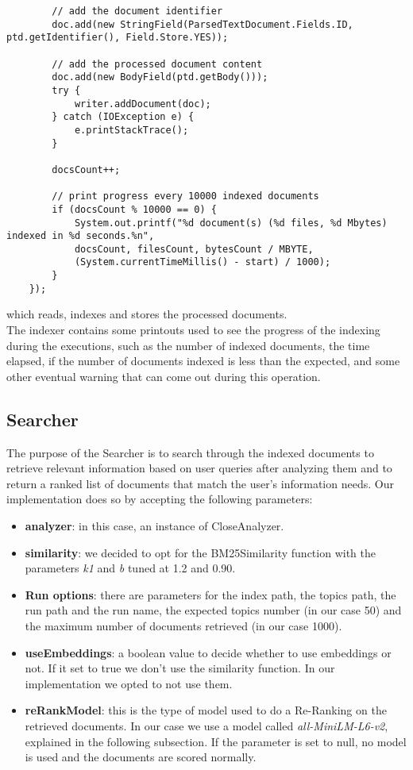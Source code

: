 \begin{itemize}
\begin{lstlisting}
        // add the document identifier
        doc.add(new StringField(ParsedTextDocument.Fields.ID, ptd.getIdentifier(), Field.Store.YES));

        // add the processed document content
        doc.add(new BodyField(ptd.getBody()));
        try {
            writer.addDocument(doc);
        } catch (IOException e) {
            e.printStackTrace();
        }

        docsCount++;

        // print progress every 10000 indexed documents
        if (docsCount % 10000 == 0) {
            System.out.printf("%d document(s) (%d files, %d Mbytes) indexed in %d seconds.%n",
            docsCount, filesCount, bytesCount / MBYTE,
            (System.currentTimeMillis() - start) / 1000);
        }
    });
\end{lstlisting}
which reads, indexes and stores the processed documents. \\
The indexer contains some printouts used to see the progress of the indexing during the executions, such as the number of indexed documents, the time elapsed, if the number of documents indexed is less than the expected, and some other eventual warning that can come out during this operation.

\subsection{Searcher}
The purpose of the Searcher is to search through the indexed documents to retrieve relevant information based on user queries after analyzing them and to
return a ranked list of documents that match the user’s information needs.
\newline
Our implementation does so by accepting the following parameters:
\begin{itemize}
  \item \textbf{analyzer}: in this case, an instance of CloseAnalyzer.
  \item \textbf{similarity}: we decided to opt for the BM25Similarity function with the parameters \textit{k1} and \textit{b} tuned at 1.2 and 0.90.
  \item \textbf{Run options}: there are parameters for the index path, the topics path, the run path and the run name, the expected topics number (in our case 50) and the maximum number of documents retrieved (in our case 1000).
  \item \textbf{useEmbeddings}: a boolean value to decide whether to use embeddings or not. If it set to true we don't use the similarity function. In our implementation we opted to not use them.
  \item \textbf{reRankModel}: this is the type of model used to do a Re-Ranking on the retrieved documents. In our case we use a model called \textit{all-MiniLM-L6-v2}, explained in the following subsection. If the parameter is set to null, no model is used and the documents are scored normally.
\end{itemize}


\end{itemize}
